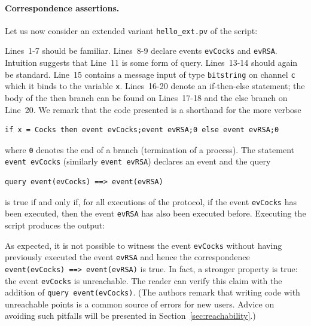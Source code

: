 \documentclass{book}
\begin{document}
\paragraph{Correspondence assertions.} Let us now consider an extended variant \texttt{{\docexdir}hello\_ext.pv} of the script:
%

%
Lines~1-7 should be familiar. Lines~8-9 declare events \lstinline!evCocks! and \lstinline!evRSA!. Intuition suggests that Line~11 is some form of query. Lines~13-14 should again be standard. Line~15 contains a message input  of type \lstinline!bitstring! on channel \lstinline{c} which it binds to the variable \lstinline!x!. Lines~16-20 denote an if-then-else statement; the body of the then branch can be found on Lines~17-18 and the else branch on Line~20. We remark that the code presented is a shorthand for the more verbose
\begin{lstlisting}[numbers=none]
if x = Cocks then event evCocks;event evRSA;0 else event evRSA;0
\end{lstlisting}
where \lstinline!0! denotes the end of a branch (termination of a process). The statement \lstinline!event evCocks! (similarly \lstinline!event evRSA!) declares an event and the query
\begin{lstlisting}[numbers=none]
query event(evCocks) ==> event(evRSA)
\end{lstlisting}
is true if and only if, for all executions of the protocol, if the event \lstinline!evCocks! has been executed, then the event \lstinline!evRSA! has also been executed before.
Executing the script produces the output:
%

%
As expected, it is not possible to witness the event \lstinline!evCocks! without having previously executed the event \lstinline!evRSA! and hence the correspondence \lstinline!event(evCocks) ==> event(evRSA)! is true. In fact, a stronger property is true: the event \lstinline!evCocks! is unreachable. The reader can verify this claim with the addition of \lstinline!query event(evCocks)!. (The authors remark that writing code with unreachable points is a common source of errors for new users. Advice on avoiding such pitfalls will be presented in Section~\ref{sec:reachability}.)


\end{document}
